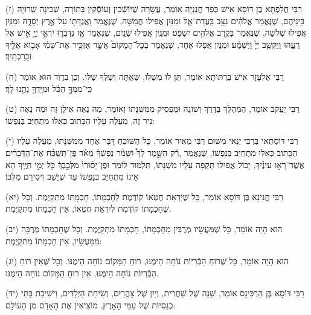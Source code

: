 \documentclass[twoside, openany, parskip=half, 11pt]{book}
\begin{document}
(ז)
רַבִּי חֲלַפְתָּא בֶּן דּוֹסָא אִישׁ כְּפַר חֲנַנְיָה אוֹמֵר, עֲשָׂרָה שֶׁיּוֹשְֿׁבִין וְעוֹסְֿקִין בַּתּוֹרָה, שְׁכִינָה שְׁרוּיָה בֵּינֵיהֶם, שֶׁנֶּאֱמַר 
 אֱלֹהִ֗ים נִצָּ֥ב בַּֽעֲדַת־אֵ֑ל וּמִנַּיִן אֲפִילוּ חֲמִשָּׁה, שֶׁנֶּאֱמַר 
 וַֽאֲגֻדָּת֖וֹ עַל־אֶ֣רֶץ יְסָדָ֑הּ וּמִנַּֽיִן אֲפִילוּ שְׁלֹשָׁה, שֶׁנֶּאֱמַר 
 בְּקֶ֖רֶב אֱלֹהִ֣ים יִשְׁפֹּֽט׃ וּמִנַּֽיִן אֲפִילוּ שְׁנַֽיִם, שֶׁנֶּאֱמַר 
אָ֧ז נִדְבְּֿר֛וּ יִרְאֵ֥י יְיָ֖ אִ֣ישׁ אֶל רֵעֵ֑הוּ וַיַּקְשֵׁ֤ב יְיָ֙ וַיִּשְׁמָ֔ע׃
וּמִנַּיִן אֲפִלּוּ אֶחָד, שֶׁנֶּאֱמַר 
בְּכָל־הַמָּקוֹם֙ אֲשֶׁ֣ר אַזְכִּ֣יר אֶת־שְׁמִ֔י אָב֥וֹא אֵלֶ֖יךָ וּבֵֽרַכְתִּֽיךָ׃


(ח)
רַבִּי אֶלְעָזָר אִישׁ בַּרְתּוֹתָא אוֹמֵר, תֵּן לוֹ מִשֶּׁלּוֹ, שֶׁאַתָּה וְשֶׁלְּךָ שֶׁלּוֹ.
וְכֵן בְּדָוִד הוּא אוֹמֵר 
  כִּֽי־מִמְּךָ֣ הַכֹּ֔ל וּמִיָּֽדְךָ֖ נָתַ֥נּוּ לָֽךְ׃

(ט) 
רַבִּי יַעֲקֹב אוֹמֵר, הַמְּֿהַלֵּךְ בַּדֶּרֶךְ וְשׁוֹנֶה וּמַפְסִיק מִמִּשְּׁנָתוֹ וְאוֹמֵר, מַה נָאֶה אִילָן זֶה וּמַה נָאֶה נִיר זֶה, מַעֲלֶה עָלָיו הַכָּתוּב כְּאִלּוּ מִתְחַיֵּב בְּנַפְשׁוֹ:

(י)
רַבִּי דּוֹסְתַאי בְּרַבִּי יַנַּאי מִשּׁוּם רַבִּי מֵאִיר אוֹמֵר, כָּל הַשּׁוֹכֵחַ דָּבָר אֶחָד מִמִּשְּׁנָתוֹ, מַעֲלֶה עָלָיו הַכָּתוּב כְּאִלּוּ מִתְחַיֵּב בְּנַפְשׁוֹ, שֶׁנֶּאֱמַר 
,רַ֡ק הִשָּׁ֣מֶר לְךָ֩ וּשְׁמֹ֨ר נַפְשְֿׁךָ֜ מְאֹ֗ד פֶּן־תִּשְׁכַּ֨ח אֶת־הַדְּֿבָרִ֜ים אֲשֶׁר־רָא֣וּ עֵינֶ֗יךָ, יָכוֹל אֲפִילוּ תָּקְפָה עָלָיו מִשְׁנָתוֹ, תַּלְמוּד לוֹמַר
וּפֶן־יָס֨וּרוּ֙ מִלְּבָ֣בְךָ֔ כֹּ֖ל יְמֵ֣י חַיֶּ֑יךָ הָא אֵינוֹ מִתְחַיַּב בְּנַפְשׁוֹ עַד שֶׁיֵּשֵׁב וִיסִירֵם מִלִּבּוֹ׃ 

(יא)
רַבִּי חֲנִינָא בֶּן דּוֹסָא אוֹמֵר, כָּל שֶׁיִּרְאַת חֶטְאוֹ קוֹדֶמֶת לְחָכְמָתוֹ, חָכְמָתוֹ מִתְקַיֶּמֶת.
וְכָל שֶׁחָכְמָתוֹ קוֹדֶמֶת לְיִרְאַת חֶטְאוֹ, אֵין חָכְמָתוֹ מִתְקַיֶּמֶת.

(יב)
הוּא הָיָה אוֹמֵר, כָּל שֶׁמַּעֲשָׂיו מְרֻבִּין מֵחָכְמָתוֹ, חָכְמָתוֹ מִתְקַיֶּמֶת.
וְכָל שֶׁחָכְמָתוֹ מְרֻבָּה מִמַּעֲשָׂיו, אֵין חָכְמָתוֹ מִתְקַיֶּמֶת:

(יג)
הוּא הָיָה אוֹמֵר, כָּל שֶׁרוּחַ הַבְּֿרִיּוֹת נוֹחָה הֵימֶנּוּ, רוּחַ הַמָּקוֹם נוֹחָה הֵימֶנּוּ.
וְכָל שֶּׁאֵין רוּחַ הַבְּֿרִיּוֹת נוֹחָה הֵימֶנּוּ, אֵין רוּחַ הַמָּקוֹם נוֹחָה הֵימֶנּוּ.

(יד)
רַבִּי דּוֹסָא בֶּן הַרְכִּינָס אוֹמֵר, שֵׁנָה שֶׁל שַׁחֲרִית, וְיַיִן שֶׁל צָהֳרַיִם, וְשִׂיחַת הַיְלָדִים, וִישִׁיבַת בָּתֵּי כְנֵסִיּוֹת שֶׁל עַמֵּי הָאָרֶץ, מוֹצִיאִין אֶת הָאָדָם מִן הָעוֹלָם:
\end{document}

